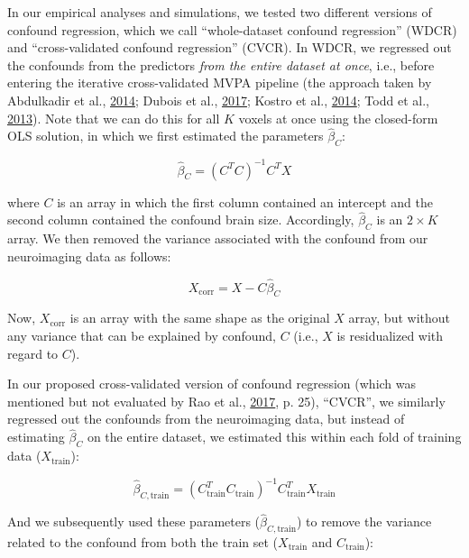 \documentclass[12pt,american,a4paper,oneside,]{memoir} %
\begin{document}
In our empirical analyses and simulations, we tested two different versions of confound regression, which we call ``whole-dataset confound regression'' (WDCR) and ``cross-validated confound regression'' (CVCR). In WDCR, we regressed out the confounds from the predictors \emph{from the entire dataset at once}, i.e., before entering the iterative cross-validated MVPA pipeline (the approach taken by Abdulkadir et al., \protect\hyperlink{ref-Abdulkadir2014-bh}{2014}; Dubois et al., \protect\hyperlink{ref-Dubois2017-fl}{2017}; Kostro et al., \protect\hyperlink{ref-Kostro2014-cm}{2014}; Todd et al., \protect\hyperlink{ref-Todd2013-sd}{2013}). Note that we can do this for all \(K\) voxels at once using the closed-form OLS solution, in which we first estimated the parameters \(\hat{\beta}_{C}\):

\begin{equation}
\hat{\beta}_{C} = (C^{T}C)^{-1}C^{T}X
\end{equation}

where \(C\) is an array in which the first column contained an intercept and the second column contained the confound brain size. Accordingly, \(\hat{\beta}_{C}\) is an \(2 \times K\) array. We then removed the variance associated with the confound from our neuroimaging data as follows:

\begin{equation}
X_{\mathrm{corr}} = X - C\hat{\beta}_{C}
\end{equation}

Now, \(X_{\mathrm{corr}}\) is an array with the same shape as the original \(X\) array, but without any variance that can be explained by confound, \(C\) (i.e., \(X\) is residualized with regard to \(C\)).

In our proposed cross-validated version of confound regression (which was mentioned but not evaluated by Rao et al., \protect\hyperlink{ref-Rao2017-bw}{2017}, p. 25), ``CVCR'', we similarly regressed out the confounds from the neuroimaging data, but instead of estimating \(\hat{\beta}_{C}\) on the entire dataset, we estimated this within each fold of training data (\(X_{\mathrm{train}}\)):

\begin{equation}
\hat{\beta}_{C,\mathrm{train}} = (C^{T}_{\mathrm{train}}C_{\mathrm{train}})^{-1}C^{T}_{\mathrm{train}}X_{\mathrm{train}}
\end{equation}

And we subsequently used these parameters (\(\hat{\beta}_{C,\mathrm{train}}\)) to remove the variance related to the confound from both the train set (\(X_{\mathrm{train}}\) and \(C_{\mathrm{train}}\)):
\end{document}

